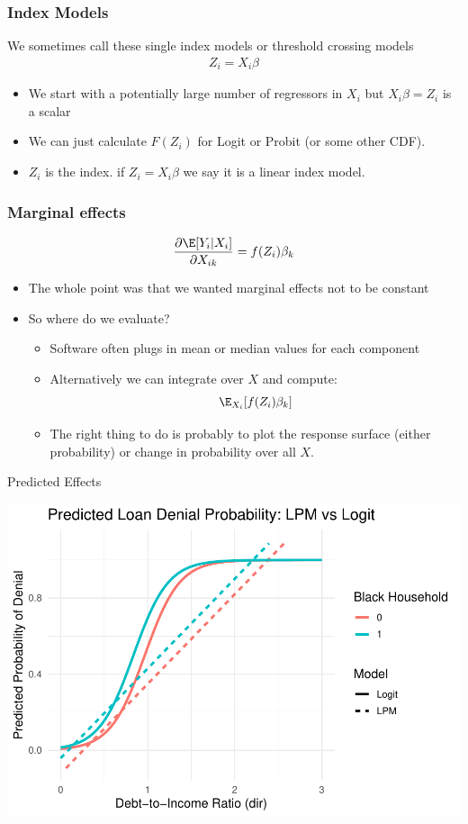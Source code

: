 \documentclass[aspectratio=169,11pt]{beamer}
\begin{document}
\begin{frame}
\frametitle{Index Models}
We sometimes call these single index models or threshold crossing models
\begin{align*}
Z_i = X_i \beta
\end{align*}
\begin{itemize}
\item We start with a potentially large number of regressors in $X_i$ but $X_i \beta = Z_i$ is a \alert{scalar}
\item We can just calculate $F(Z_i)$ for Logit or Probit (or some other CDF).
\item $Z_i$ is the \alert{index}. if $Z_i = X_i \beta$ we say it is a \alert{linear index} model.
\end{itemize}
\end{frame}



\begin{frame}
\frametitle{Marginal effects}
\begin{align*}
\frac{\partial \E[Y_i | X_i] }{\partial X_{ik}} = f (Z_i) \beta_k
\end{align*}
\begin{itemize}
\item The whole point was that we wanted marginal effects not to be constant
\item So where do we evaluate?
\begin{itemize}
\item Software often plugs in mean or median values for each component
\item Alternatively we can integrate over $X$ and compute:
$$
\E_{X_i}[ f (Z_i) \beta_k]
$$
\item The right thing to do is probably to plot the response surface (either probability) or change in probability over all $X$.
\end{itemize}
\end{itemize}
\end{frame}


\begin{frame}{Predicted Effects}
\begin{center}
\includegraphics[height=0.9\textheight]{resources/predicted_effects.pdf}
\end{center}
\end{frame}
\end{document}
